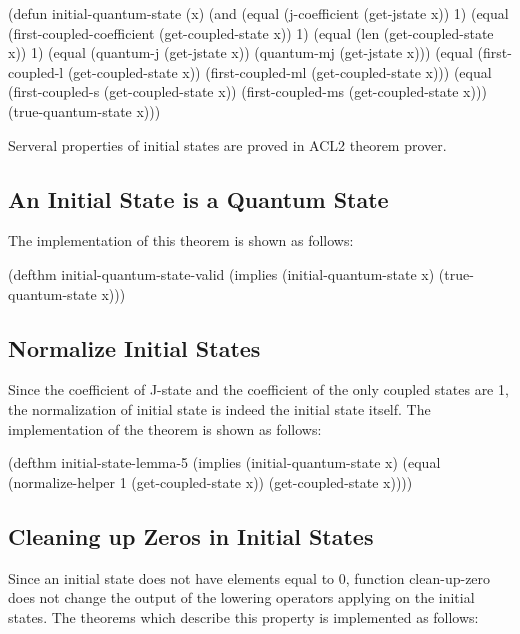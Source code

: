\documentclass[12pt,journal,compsoc]{IEEEtran}
\begin{document}
\begin{acl2-lst}
(defun initial-quantum-state (x)
 (and (equal (j-coefficient (get-jstate x)) 1)
  (equal (first-coupled-coefficient 
	  (get-coupled-state x)) 
   1)
  (equal (len (get-coupled-state x)) 1)
  (equal (quantum-j (get-jstate x))
   (quantum-mj (get-jstate x)))
  (equal (first-coupled-l (get-coupled-state x))
   (first-coupled-ml (get-coupled-state x)))
  (equal (first-coupled-s (get-coupled-state x))
   (first-coupled-ms (get-coupled-state x)))
  (true-quantum-state x)))
\end{acl2-lst}

Serveral properties of initial states are proved in ACL2 theorem prover.

\subsection{An Initial State is a Quantum State}

The implementation of this theorem is shown as follows:

\begin{acl2-lst}
(defthm initial-quantum-state-valid 
 (implies (initial-quantum-state x)
  (true-quantum-state x)))
\end{acl2-lst}

\subsection{Normalize Initial States}

Since the coefficient of J-state and the coefficient of the only coupled states are 1, the normalization of initial state is indeed the initial state itself. The implementation of the theorem is shown as follows:

\begin{acl2-lst}
(defthm initial-state-lemma-5
 (implies (initial-quantum-state x)
  (equal (normalize-helper 1 
			(get-coupled-state x))
   (get-coupled-state x))))
\end{acl2-lst}

\subsection{Cleaning up Zeros in Initial States}

Since an initial state does not have elements equal to 0, function clean-up-zero does not change the output of the lowering operators applying on the initial states. The theorems which describe this property is implemented as follows:
\end{document}
